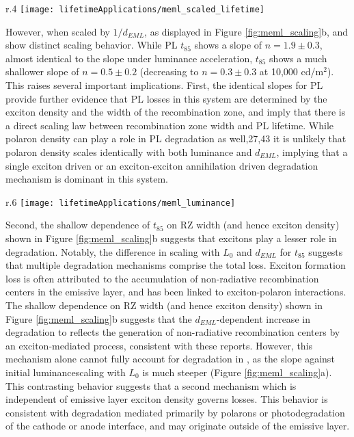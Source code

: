 \documentclass[../thesis.tex]{subfiles}
\begin{document}
\begin{wrapfigure}{r}{.4\textwidth}
\centering
\texttt{[image: lifetimeApplications/meml\_scaled\_lifetime]}
\caption{Lifetimes of devices with luminance scaled to match the EML thickness. PL collapses due to matched exciton density.}
\label{fig:meml_scaled_lifetime}
\end{wrapfigure}
However, when scaled by $1/d_{EML}$, as displayed in Figure \ref{fig:meml_scaling}b, \ef and \pl show distinct scaling behavior. 
While PL $t_{85}$ shows a slope of $n = 1.9\pm0.3$, almost identical to the slope under luminance acceleration, \ef $t_{85}$ shows a much shallower slope of $n = 0.5\pm0.2$ (decreasing to $n = 0.3\pm0.3$ at 10,000 cd/m$^2$). 
This raises several important implications.
First, the identical slopes for PL provide further evidence that PL losses in this system are determined by the exciton density and the width of the recombination zone, and imply that there is a direct scaling law between recombination zone width and PL lifetime. 
While polaron density can play a role in PL degradation as well,27,43 it is unlikely that polaron density scales identically with both luminance and $d_{EML}$, implying that a single exciton driven or an exciton-exciton annihilation driven degradation mechanism is dominant in this system.

\begin{wrapfigure}{r}{.6\textwidth}
\centering
\texttt{[image: lifetimeApplications/meml\_luminance]}
\caption{Scaling behavior of \pl and \ef as a function of a) luminance and b) exciton density.}
\label{fig:meml_scaling}
\end{wrapfigure}

Second, the shallow dependence of \ef $t_{85}$ on RZ width (and hence exciton density) shown in Figure \ref{fig:meml_scaling}b suggests that excitons play a lesser role in \ef degradation. 
Notably, the difference in scaling with $L_0$ and $d_{EML}$ for \ef $t_{85}$ suggests that multiple degradation mechanisms comprise the total \ef loss.  
Exciton formation loss is often attributed to the accumulation of non-radiative recombination centers in the emissive layer,\supercite{Kondakov2003,Kondakov2007d} and has been linked to exciton-polaron interactions.\supercite{Zhang2017a}
The shallow dependence on RZ width (and hence exciton density) shown in Figure \ref{fig:meml_scaling}b suggests that the $d_{EML}$-dependent increase in \ef degradation to reflects the generation of non-radiative recombination centers by an exciton-mediated process, consistent with these reports. 
However, this mechanism alone cannot fully account for degradation in \ef, as the slope against initial luminancescaling with $L_0$ is much steeper (Figure \ref{fig:meml_scaling}a). 
This contrasting behavior suggests that a second mechanism which is independent of emissive layer exciton density governs \ef losses. 
This behavior is consistent with degradation mediated primarily by polarons or photodegradation of the cathode or anode interface, and may originate outside of the emissive layer. \supercite{Wang2012,Wang2010a}
\end{document}
